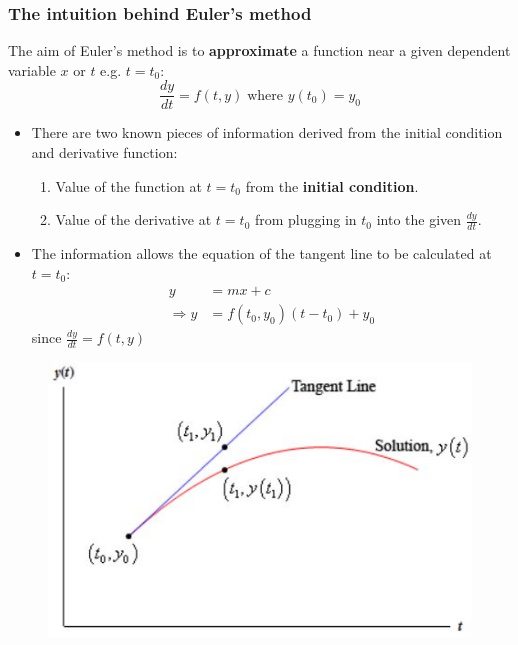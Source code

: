 \documentclass[10pt,a4paper]{article}
\begin{document}
\subsubsection{The intuition behind Euler's method}

The aim of Euler's method is to \textbf{approximate} a function near a given dependent variable $x$
or $t$ e.g. $t=t_0$:
$$
    \frac{dy}{dt} = f(t,y) \; \text{where } y(t_0) = y_0
$$

\begin{itemize}
    \item There are two known pieces of information derived from the initial condition and derivative
    function: 
    \begin{enumerate}
        \item Value of the function at $t=t_0$ from the \textbf{initial condition}.
        \item Value of the derivative at $t=t_0$ from plugging in $t_0$ into the given
        $\frac{dy}{dt}$.
    \end{enumerate}

    \item The information allows the equation of the tangent line to be calculated at $t=t_0$:
    \begin{align*}
        y &= mx + c \\
        \Rightarrow y &= f(t_0,y_0)(t-t_0) + y_0 
    \end{align*}
    since $\frac{dy}{dt} = f(t,y)$
\end{itemize}

\begin{figure} [h!]
    \centering
    \includegraphics[scale=0.7]{Euler.JPG}
\end{figure}
\end{document}
